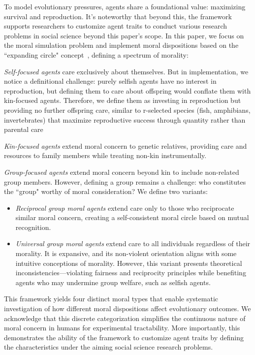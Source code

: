 \documentclass[letterpaper]{article} %
\begin{document}
To model evolutionary pressures, agents share a foundational value: maximizing survival and reproduction. It's noteworthy that beyond this, the framework supports researchers to customize agent traits to conduct various research problems in social science beyond this paper's scope. In this paper, we focus on the moral simulation problem and implement moral dispositions based on the ``expanding circle" concept~\citep{singer1981expanding}, defining a spectrum of morality:


\textit{Self-focused agents} care exclusively about themselves. But in implementation, we notice a definitional challenge: purely selfish agents have no interest in reproduction, but defining them to care about offspring would conflate them with kin-focused agents. 
Therefore, we define them as investing in reproduction but providing no further offspring care, similar to
r-selected species (fish, amphibians, invertebrates) that maximize reproductive success through quantity rather than parental care~\citep{pianka1970r, stearns1992evolution, gross2005evolution, reznick2002r, trumbo2012patterns}

\textit{Kin-focused agents} extend moral concern to genetic relatives, providing care and resources to family members while treating non-kin instrumentally.

\textit{Group-focused agents} extend moral concern beyond kin to include non-related group members. However, defining a group remains a challenge: who constitutes the ``group" worthy of moral consideration? We define two variants:
\begin{itemize}
    \item \textit{Reciprocal group moral agents} extend care only to those who reciprocate similar moral concern, creating a self-consistent moral circle based on mutual recognition.
    \item \textit{Universal group moral agents} extend care to all individuals regardless of their morality. It is expansive, and its non-violent orientation aligns with some intuitive conceptions of morality. However, this variant presents theoretical inconsistencies—violating fairness and reciprocity principles while benefiting agents who may undermine group welfare, such as selfish agents.
\end{itemize}


This framework yields four distinct moral types that enable systematic investigation of how different moral dispositions affect evolutionary outcomes. We acknowledge that this discrete categorization simplifies the continuous nature of moral concern in humans for experimental tractability. 
More importantly, this demonstrates the ability of the framework to customize agent traits by defining the characteristics under the aiming social science research problems.
\end{document}
